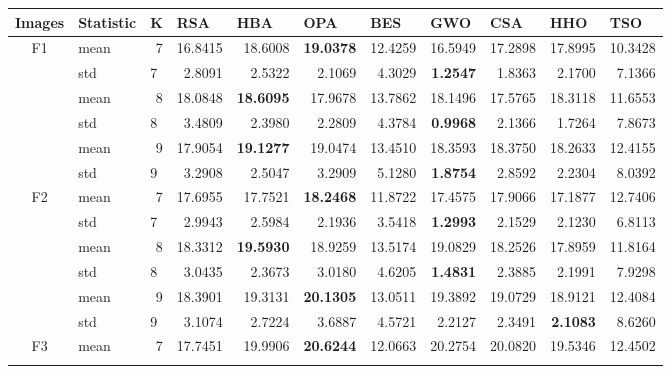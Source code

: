 \documentclass[conference]{IEEEtran}
\begin{document}
\begin{table}[]
\begin{tabular}{|c|l|l|r|r|r|r|r|r|r|r|}
\hline
\multicolumn{1}{|l|}{\textbf{Images}} & \textbf{Statistic} & \textbf{K} & \multicolumn{1}{l|}{\textbf{RSA}} & \multicolumn{1}{l|}{\textbf{HBA}} & \multicolumn{1}{l|}{\textbf{OPA}} & \multicolumn{1}{l|}{\textbf{BES}} & \multicolumn{1}{l|}{\textbf{GWO}} & \multicolumn{1}{l|}{\textbf{CSA}} & \multicolumn{1}{l|}{\textbf{HHO}} & \multicolumn{1}{l|}{\textbf{TSO}} \\ \hline
\multirow{6}{*}{F1} & mean & \multicolumn{1}{r|}{7} & 16.8415 & 18.6008 & \textbf{19.0378} & 12.4259 & 16.5949 & 17.2898 & 17.8995 & 10.3428 \\ \cline{2-11} 
 & std & 7 & 2.8091 & 2.5322 & 2.1069 & 4.3029 & \textbf{1.2547} & 1.8363 & 2.1700 & 7.1366 \\ \cline{2-11} 
 & mean & \multicolumn{1}{r|}{8} & 18.0848 & \textbf{18.6095} & 17.9678 & 13.7862 & 18.1496 & 17.5765 & 18.3118 & 11.6553 \\ \cline{2-11} 
 & std & 8 & 3.4809 & 2.3980 & 2.2809 & 4.3784 & \textbf{0.9968} & 2.1366 & 1.7264 & 7.8673 \\ \cline{2-11} 
 & mean & \multicolumn{1}{r|}{9} & 17.9054 & \textbf{19.1277} & 19.0474 & 13.4510 & 18.3593 & 18.3750 & 18.2633 & 12.4155 \\ \cline{2-11} 
 & std & 9 & 3.2908 & 2.5047 & 3.2909 & 5.1280 & \textbf{1.8754} & 2.8592 & 2.2304 & 8.0392 \\ \hline
\multirow{6}{*}{F2} & mean & \multicolumn{1}{r|}{7} & 17.6955 & 17.7521 & \textbf{18.2468} & 11.8722 & 17.4575 & 17.9066 & 17.1877 & 12.7406 \\ \cline{2-11} 
 & std & 7 & 2.9943 & 2.5984 & 2.1936 & 3.5418 & \textbf{1.2993} & 2.1529 & 2.1230 & 6.8113 \\ \cline{2-11} 
 & mean & \multicolumn{1}{r|}{8} & 18.3312 & \textbf{19.5930} & 18.9259 & 13.5174 & 19.0829 & 18.2526 & 17.8959 & 11.8164 \\ \cline{2-11} 
 & std & 8 & 3.0435 & 2.3673 & 3.0180 & 4.6205 & \textbf{1.4831} & 2.3885 & 2.1991 & 7.9298 \\ \cline{2-11} 
 & mean & \multicolumn{1}{r|}{9} & 18.3901 & 19.3131 & \textbf{20.1305} & 13.0511 & 19.3892 & 19.0729 & 18.9121 & 12.4084 \\ \cline{2-11} 
 & std & 9 & 3.1074 & 2.7224 & 3.6887 & 4.5721 & 2.2127 & 2.3491 & \textbf{2.1083} & 8.6260 \\ \hline
\multirow{6}{*}{F3} & mean & \multicolumn{1}{r|}{7} & 17.7451 & 19.9906 & \textbf{20.6244} & 12.0663 & 20.2754 & 20.0820 & 19.5346 & 12.4502 \\ \cline{2-11} 

\end{tabular}
\end{table}
\end{document}
